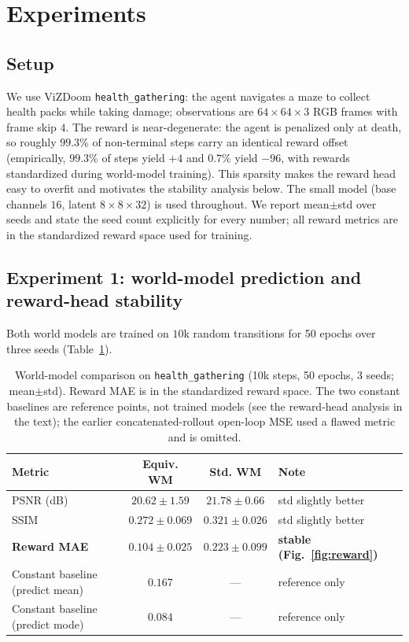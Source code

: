\documentclass[sigconf,anonymous]{acmart}
\begin{document}
\section{Experiments}\label{sec:exp}

\subsection{Setup}
We use ViZDoom \texttt{health\_gathering}: the agent navigates a maze to
collect health packs while taking damage; observations are $64\times64\times3$
RGB frames with frame skip $4$. The reward is near-degenerate: the agent is
penalized only at death, so roughly $99.3\%$ of non-terminal steps carry an
identical reward offset (empirically, $99.3\%$ of steps yield $+4$ and
$0.7\%$ yield $-96$, with rewards standardized during world-model training).
This sparsity makes the reward head easy to overfit and motivates the
stability analysis below. The small model (base channels $16$, latent
$8\times8\times32$) is used throughout. We report mean$\pm$std over seeds and
state the seed count explicitly for every number; all reward metrics are in
the standardized reward space used for training.

\subsection{Experiment 1: world-model prediction and reward-head stability}
Both world models are trained on $10$k random transitions for 50 epochs over
three seeds (Table~\ref{tab:wm}).

\begin{table}[t]
\centering
\caption{World-model comparison on \texttt{health\_gathering} (10k steps,
50 epochs, 3 seeds; mean$\pm$std). Reward MAE is in the standardized reward
space. The two constant baselines are reference points, not trained models
(see the reward-head analysis in the text); the earlier concatenated-rollout
open-loop MSE used a flawed metric and is omitted.}
\label{tab:wm}
\small\setlength{\tabcolsep}{3pt}
\begin{tabular}{@{}lccp{2.6cm}@{}}
\toprule
Metric & Equiv. WM & Std. WM & Note \\
\midrule
PSNR (dB)            & $20.62\pm1.59$ & $21.78\pm0.66$ & std slightly better \\
SSIM                 & $0.272\pm0.069$ & $0.321\pm0.026$ & std slightly better \\
\textbf{Reward MAE}  & $\mathbf{0.104\pm0.025}$ & $0.223\pm0.099$ & \textbf{stable (Fig.~\ref{fig:reward})} \\
\midrule
Constant baseline (predict mean) & $0.167$ & --- & reference only \\
Constant baseline (predict mode) & $0.084$ & --- & reference only \\
\bottomrule
\end{tabular}
\end{table}
\end{document}
